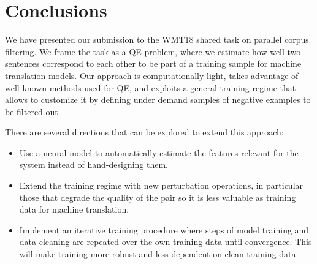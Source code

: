 \section{Conclusions}
We have presented our submission to the WMT18 shared task on parallel corpus filtering. We frame the task as a QE problem, where we estimate how well two sentences correspond to each other to be part of a training sample for machine translation models. Our approach is computationally light, takes advantage of well-known methods used for QE, and exploits a general training regime that allows to customize it by defining under demand samples of negative examples to be filtered out.

There are several directions that can be explored to extend this approach:
\begin{itemize}
\item Use a neural model to automatically estimate the features relevant for the system instead of hand-designing them.
\item Extend the training regime with new perturbation operations, in particular those that degrade the quality of the pair so it is less valuable as training data for machine translation.
\item Implement an iterative training procedure where steps of model training and data cleaning are repeated over the own training data until convergence. This will make training more robust and less dependent on clean training data.
\end{itemize}